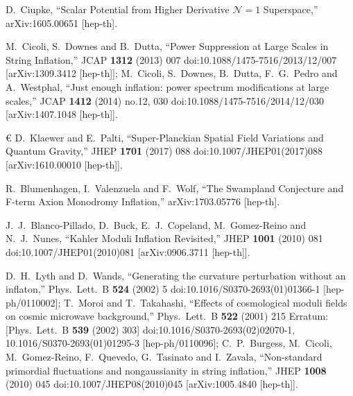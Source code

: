 \documentclass[11pt,a4paper]{article}
\begin{document}
\begin{thebibliography}{99}
  D.~Ciupke,
  ``Scalar Potential from Higher Derivative $\mathcal{N} = 1$ Superspace,''
  arXiv:1605.00651 [hep-th].
  
  M.~Cicoli, S.~Downes and B.~Dutta,
  ``Power Suppression at Large Scales in String Inflation,''
  JCAP {\bf 1312} (2013) 007
  doi:10.1088/1475-7516/2013/12/007
  [arXiv:1309.3412 [hep-th]];
	M.~Cicoli, S.~Downes, B.~Dutta, F.~G.~Pedro and A.~Westphal,
  ``Just enough inflation: power spectrum modifications at large scales,''
  JCAP {\bf 1412} (2014) no.12,  030
  doi:10.1088/1475-7516/2014/12/030
  [arXiv:1407.1048 [hep-th]].
	
€
  D.~Klaewer and E.~Palti,
  ``Super-Planckian Spatial Field Variations and Quantum Gravity,''
  JHEP {\bf 1701} (2017) 088
  doi:10.1007/JHEP01(2017)088
  [arXiv:1610.00010 [hep-th]].
	
  R.~Blumenhagen, I.~Valenzuela and F.~Wolf,
  ``The Swampland Conjecture and F-term Axion Monodromy Inflation,''
  arXiv:1703.05776 [hep-th].	

  J.~J.~Blanco-Pillado, D.~Buck, E.~J.~Copeland, M.~Gomez-Reino and N.~J.~Nunes,
  ``Kahler Moduli Inflation Revisited,''
  JHEP {\bf 1001} (2010) 081
  doi:10.1007/JHEP01(2010)081
  [arXiv:0906.3711 [hep-th]].

D.~H.~Lyth and D.~Wands,
  ``Generating the curvature perturbation without an inflaton,''
  Phys.\ Lett.\ B {\bf 524} (2002) 5
  doi:10.1016/S0370-2693(01)01366-1
  [hep-ph/0110002];
T.~Moroi and T.~Takahashi,
  ``Effects of cosmological moduli fields on cosmic microwave background,''
  Phys.\ Lett.\ B {\bf 522} (2001) 215
   Erratum: [Phys.\ Lett.\ B {\bf 539} (2002) 303]
  doi:10.1016/S0370-2693(02)02070-1, 10.1016/S0370-2693(01)01295-3
  [hep-ph/0110096];
 C.~P.~Burgess, M.~Cicoli, M.~Gomez-Reino, F.~Quevedo, G.~Tasinato and I.~Zavala,
  ``Non-standard primordial fluctuations and nongaussianity in string inflation,''
  JHEP {\bf 1008} (2010) 045
  doi:10.1007/JHEP08(2010)045
  [arXiv:1005.4840 [hep-th]].


\end{thebibliography}
\end{document}
